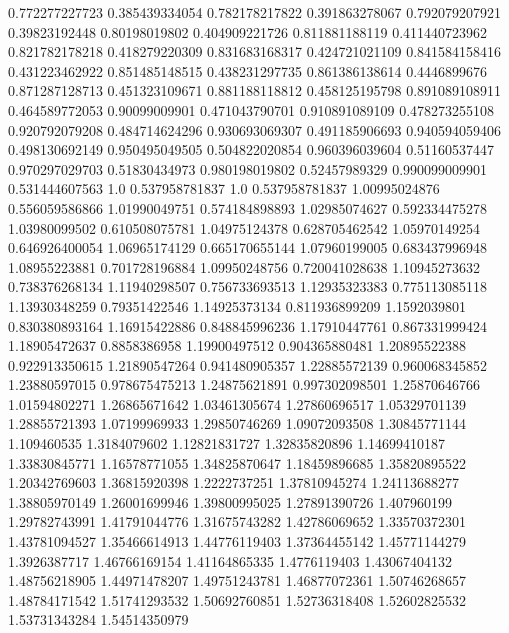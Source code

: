  0.772277227723   0.385439334054
 0.782178217822   0.391863278067
 0.792079207921    0.39823192448
  0.80198019802   0.404909221726
 0.811881188119   0.411440723962
 0.821782178218   0.418279220309
 0.831683168317   0.424721021109
 0.841584158416   0.431223462922
 0.851485148515   0.438231297735
 0.861386138614     0.4446899676
 0.871287128713   0.451323109671
 0.881188118812   0.458125195798
 0.891089108911   0.464589772053
  0.90099009901   0.471043790701
 0.910891089109   0.478273255108
 0.920792079208   0.484714624296
 0.930693069307   0.491185906693
 0.940594059406   0.498130692149
 0.950495049505   0.504822020854
 0.960396039604    0.51160537447
 0.970297029703    0.51830434973
 0.980198019802    0.52457989329
 0.990099009901   0.531444607563
            1.0   0.537958781837
            1.0   0.537958781837
  1.00995024876   0.556059586866
  1.01990049751   0.574184898893
  1.02985074627   0.592334475278
  1.03980099502   0.610508075781
  1.04975124378   0.628705462542
  1.05970149254   0.646926400054
  1.06965174129   0.665170655144
  1.07960199005   0.683437996948
  1.08955223881   0.701728196884
  1.09950248756   0.720041028638
  1.10945273632   0.738376268134
  1.11940298507   0.756733693513
  1.12935323383   0.775113085118
  1.13930348259    0.79351422546
  1.14925373134   0.811936899209
   1.1592039801   0.830380893164
  1.16915422886   0.848845996236
  1.17910447761   0.867331999424
  1.18905472637     0.8858386958
  1.19900497512   0.904365880481
  1.20895522388   0.922913350615
  1.21890547264   0.941480905357
  1.22885572139   0.960068345852
  1.23880597015   0.978675475213
  1.24875621891   0.997302098501
  1.25870646766    1.01594802271
  1.26865671642    1.03461305674
  1.27860696517    1.05329701139
  1.28855721393    1.07199969933
  1.29850746269    1.09072093508
  1.30845771144      1.109460535
   1.3184079602    1.12821831727
  1.32835820896    1.14699410187
  1.33830845771    1.16578771055
  1.34825870647    1.18459896685
  1.35820895522    1.20342769603
  1.36815920398     1.2222737251
  1.37810945274    1.24113688277
  1.38805970149    1.26001699946
  1.39800995025    1.27891390726
    1.407960199    1.29782743991
  1.41791044776    1.31675743282
  1.42786069652    1.33570372301
  1.43781094527    1.35466614913
  1.44776119403    1.37364455142
  1.45771144279     1.3926387717
  1.46766169154    1.41164865335
   1.4776119403    1.43067404132
  1.48756218905    1.44971478207
  1.49751243781    1.46877072361
  1.50746268657    1.48784171542
  1.51741293532    1.50692760851
  1.52736318408    1.52602825532
  1.53731343284    1.54514350979

